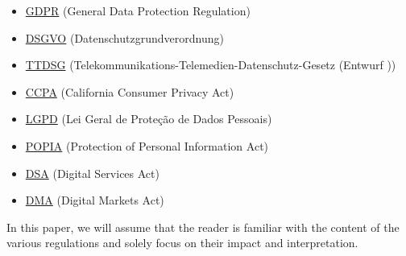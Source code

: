 \begin{itemize}
 \item \href{https://gdpr-info.eu/}{GDPR} (General Data Protection Regulation)
 \item \href{https://www.datenschutz-grundverordnung.eu/}{DSGVO} (Datenschutzgrundverordnung)
 \item \href{https://dsgvo-gesetz.de/ttdsg/}{TTDSG} (Telekommunikations-Telemedien-Datenschutz-Gesetz (Entwurf ))
 \item \href{https://oag.ca.gov/privacy/ccpa}{CCPA} (California Consumer Privacy Act)
 \item \href{https://www.lgpdbrasil.com.br/}{LGPD} (Lei Geral de Proteção de Dados Pessoais)
 \item \href{https://popia.co.za/}{POPIA} (Protection of Personal Information Act)
 \item \href{https://ec.europa.eu/info/strategy/priorities-2019-2024/europe-fit-digital-age/digital-services-act-ensuring-safe-and-accountable-online-environment_en}{DSA} (Digital Services Act)
 \item \href{https://ec.europa.eu/info/strategy/priorities-2019-2024/europe-fit-digital-age/digital-markets-act-ensuring-fair-and-open-digital-markets_en}{DMA} (Digital Markets Act)
\end{itemize}

In this paper, we will assume that the reader is familiar with the content of the various regulations and solely focus on their impact and interpretation.
